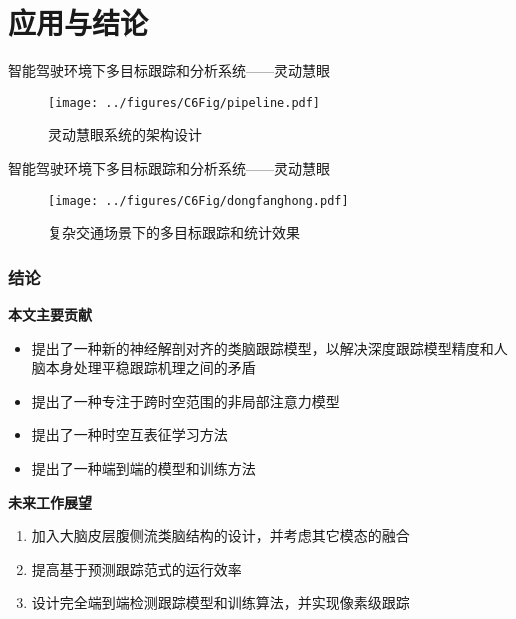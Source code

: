 \section{应用与结论}

\begin{frame}{智能驾驶环境下多目标跟踪和分析系统——灵动慧眼}
	\begin{figure}[!t]
		\centering
		\texttt{[image: ../figures/C6Fig/pipeline.pdf]}
		\caption{灵动慧眼系统的架构设计}
	\end{figure}
\end{frame}


\begin{frame}{智能驾驶环境下多目标跟踪和分析系统——灵动慧眼}
	\begin{figure}[!t]
		\centering
		\texttt{[image: ../figures/C6Fig/dongfanghong.pdf]}
		\caption{复杂交通场景下的多目标跟踪和统计效果}
	\end{figure}
\end{frame}


\begin{frame}
	\frametitle{结论}
	\begin{block}{\textbf{本文主要贡献}}
		\begin{itemize}
			\item<0-> 提出了一种新的神经解剖对齐的类脑跟踪模型，以解决深度跟踪模型精度和人脑本身处理平稳跟踪机理之间的矛盾
			\item<0-> 提出了一种专注于跨时空范围的非局部注意力模型
			\item<0-> 提出了一种时空互表征学习方法
			\item<0-> 提出了一种端到端的模型和训练方法
		\end{itemize}
	\end{block}
	
	\begin{block}{\textbf{未来工作展望}}
		\begin{enumerate}
			\item<0-> 加入大脑皮层腹侧流类脑结构的设计，并考虑其它模态的融合
			\item<0-> 提高基于预测跟踪范式的运行效率
			\item<0-> 设计完全端到端检测跟踪模型和训练算法，并实现像素级跟踪
		\end{enumerate}
	\end{block}
\end{frame}


